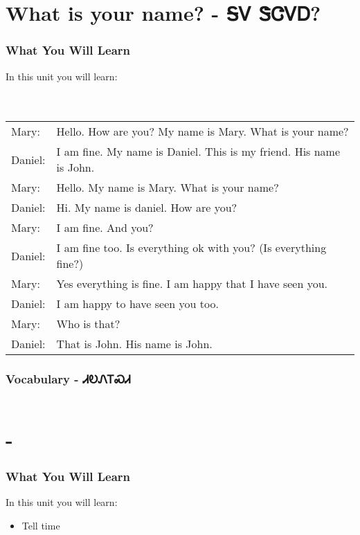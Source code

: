 \chapter{What is your name? - ᎦᏙ ᏕᏣᏙᎠ?}
\subsection{What You Will Learn}
In this unit you will learn:
\\
\\
\\
\noindent\begin{tabular}{p{2cm} p{11cm}}Mary: & Hello.  How are you?  My name is Mary.  What is your name?\\
Daniel: & I am fine.  My name is Daniel.  This is my friend.  His name is John.\\
Mary: & Hello.  My name is Mary.  What is your name?\\
Daniel: & Hi.  My name is daniel.  How are you?\\
Mary: & I am fine.  And you?\\
Daniel: & I am fine too.  Is everything ok with you? (Is everything fine?)\\
Mary: & Yes everything is fine.  I am happy that I have seen you.\\
Daniel: & I am happy to have seen you too.\\
Mary: & Who is that?\\
Daniel: & That is John.  His name is John.\\
\end{tabular}
\subsection{Vocabulary - ᏗᎧᏁᎢᏍᏗ 
}
\begin{tabular}{p{3cm} p{11cm}}
\end{tabular}

\index{}
\index{}
\chapter{ - }
\subsection{What You Will Learn}
In this unit you will learn:
\begin{itemize}
\item Tell time
\end{itemize}\newpage

